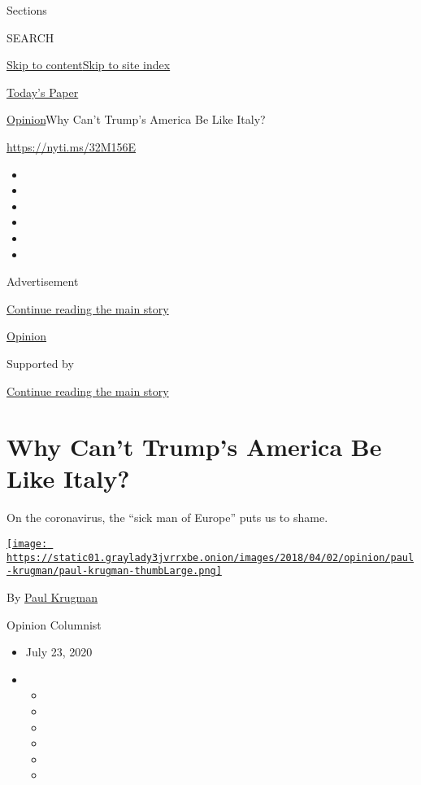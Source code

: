 Sections

SEARCH

\protect\hyperlink{site-content}{Skip to
content}\protect\hyperlink{site-index}{Skip to site index}

\href{https://myaccount.nytimes3xbfgragh.onion/auth/login?response_type=cookie\&client_id=vi}{}

\href{https://www.nytimes3xbfgragh.onion/section/todayspaper}{Today's
Paper}

\href{/section/opinion}{Opinion}\textbar{}Why Can't Trump's America Be
Like Italy?

\url{https://nyti.ms/32M156E}

\begin{itemize}
\item
\item
\item
\item
\item
\item
\end{itemize}

Advertisement

\protect\hyperlink{after-top}{Continue reading the main story}

\href{/section/opinion}{Opinion}

Supported by

\protect\hyperlink{after-sponsor}{Continue reading the main story}

\hypertarget{why-cant-trumps-america-be-like-italy}{%
\section{Why Can't Trump's America Be Like
Italy?}\label{why-cant-trumps-america-be-like-italy}}

On the coronavirus, the ``sick man of Europe'' puts us to shame.

\href{https://www.nytimes3xbfgragh.onion/by/paul-krugman}{\texttt{[image: https://static01.graylady3jvrrxbe.onion/images/2018/04/02/opinion/paul-krugman/paul-krugman-thumbLarge.png]}}

By \href{https://www.nytimes3xbfgragh.onion/by/paul-krugman}{Paul
Krugman}

Opinion Columnist

\begin{itemize}
\item
  July 23, 2020
\item
  \begin{itemize}
  \item
  \item
  \item
  \item
  \item
  \item
  \end{itemize}
\end{itemize}

